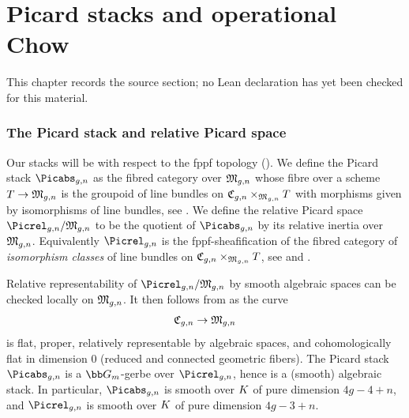 \chapter{Picard stacks and operational Chow}
\label{pixtons-formula-abel-jacobi-picard-stack-chapter-03}

\begin{remark}
\label{pixtons-formula-abel-jacobi-picard-stack-chapter-03-source}
This chapter records the source section; no Lean declaration has yet been checked for this material.
\notready
\end{remark}

\label{sec:pic_and_chow}

\subsection{The Picard stack and relative Picard space} \label{sec:pic_stacks}
Our stacks will be with respect to the fppf topology (\cite[Definition 9.1.1]{OlssonAlgebraic-spaces}).
We define the Picard stack $\Picabs_{g,n}$ as the fibred category over $\frak M_{g,n}$ whose fibre over a scheme $T \to \frak M_{g,n}$ is the groupoid of line bundles on $\frak C_{g,n} \times_{\frak M_{g,n}} T$ with morphisms given by isomorphisms of line bundles, see \cite[14.4.7]{Laumon2000Champs-algebriq}. We define the relative Picard space $\Picrel_{g,n}/\frak M_{g,n}$ to be the quotient of $\Picabs_{g,n}$ by its relative inertia over $\frak M_{g,n}$. Equivalently $\Picrel_{g,n}$ is the fppf-sheafification of the fibred category of \emph{isomorphism classes} of line bundles on $\frak C_{g,n} \times_{\frak M_{g,n}} T$,
see \cite[Chapter 8]{Bosch1990Neron-models} and \cite[Chapter 9]{Fantechi2005Fundamental-alg}.

Relative representability of $\Picrel_{g,n}/\frak M_{g, n}$ by smooth algebraic spaces can be checked locally on $\frak M_{g,n}$. It then follows from \cite[Appendix]{Artin1974Versal-deform} as the curve $$\frak C_{g,n} \to \frak M_{g,n}$$
is flat, proper, relatively representable by algebraic spaces, and cohomologically flat in dimension 0 (reduced and connected geometric fibers). The Picard stack $\Picabs_{g,n}$ is a $\bb G_m$-gerbe over $\Picrel_{g,n}$, hence is a (smooth) algebraic stack. In particular, $\Picabs_{g,n}$ is smooth over $K$ of pure dimension $4g-4 + n$, and $\Picrel_{g,n}$ is smooth over $K$ of pure dimension $4g - 3 + n$.

